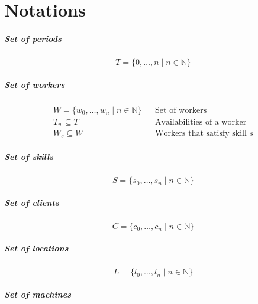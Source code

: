 \documentclass[../../thesis.tex]{subfiles}
\begin{document}
\chapter{Notations}
\label{appendix:notations}


\paragraph{Set of periods}
\begin{equation*}
  T = \{ 0, \dots, n \mid n \in \mathbb{N} \}
\end{equation*}


\paragraph{Set of workers}

\begin{align*}
  W = \{ w_0, \dots, w_n \mid n \in \mathbb{N} \} && \text{Set of workers} \\
  T_w \subseteq T && \text{Availabilities of a worker} \\ 
  W_s \subseteq W && \text{Workers that satisfy skill $s$}
\end{align*} 

\paragraph{Set of skills}

\begin{equation*}
  S = \{ s_0, \dots, s_n \mid n \in \mathbb{N} \}
\end{equation*}

\paragraph{Set of clients}

\begin{equation*}
    C = \{ c_0, \dots, c_n \mid n \in \mathbb{N} \}
\end{equation*}

\paragraph{Set of locations}

\begin{equation*}
  L = \{ l_0, \dots, l_n \mid n \in \mathbb{N} \}
\end{equation*}

\paragraph{Set of machines}
\end{document}
